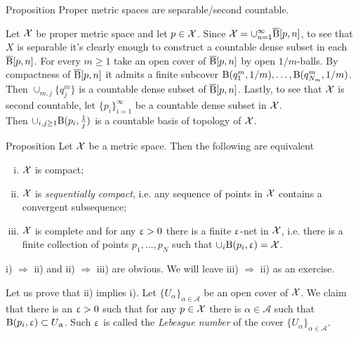 \begin{thm}{Proposition}
Proper metric spaces are separable/second countable.
\end{thm}
Let $\mathcal{X}$ be  proper metric space and let $p\in \spc{X}$. Since $\spc{X}=\cup_{n=1}^\infty\cBall[p,n]$, to see that $X$ is separable it's clearly enough to construct a countable dense subset in  each $\overline{\mathrm{B}}{}[p,n]$. For every $m\ge 1$  take  an open cover of $\overline{\mathrm{B}}{}[p,n]$ by open $1/m$-balls. By compactness of $\overline{\mathrm{B}}{}[p,n]$ it admits a finite subcover $\mathrm{B}{}(q^m_1,1/m),\ldots, \mathrm{B}{}(q^m_{N_m},1/m)$. Then $\cup_{m, j} \{q^m_j\}$ is a countable dense subset of $\overline{\mathrm{B}}{}[p,n]$.
Lastly, to see that $\mathcal{X}$ is second countable, let $\{p_i\}_{i=1}^\infty$ be a countable dense subset in $\mathcal{X}$. \\ Then $\cup_{i,j\ge 1} \oBall(p_i,\frac 1 j)$ is a countable basis of topology of $\mathcal{X}$.
\qeds


\begin{thm}{Proposition}\label{compact=seq-compact}
Let $\mathcal{X}$ be a metric space. Then the following are equivalent
\begin{enumerate}[i)]
\item $\mathcal{X}$ is compact;
\item $\mathcal{X}$ is \emph{sequentially compact}, i.e. any sequence of points in $\mathcal{X}$ contains a convergent subsequence;
\item $\mathcal{X}$ is complete and for any $\upvarepsilon>0$ there is a finite $\upvarepsilon$-net in $\mathcal{X}$, i.e. there is a finite collection of points $p_1,\ldots,p_{N}$ such that $\cup_i\oBall(p_i,\eps)=\spc{X}$.
\end{enumerate}
\end{thm}
i) $\Rightarrow$ ii)  and ii) $\Rightarrow$  iii) are  obvious. We will leave iii) $\Rightarrow$  ii) as an exercise.

Let us prove that ii) implies i). Let $\{U_\alpha\}_{\alpha\in\mathcal A}$ be an open cover of $\mathcal{X}$. 
We claim that there is an $\upvarepsilon>0$ such that for any $p\in \spc{X}$ there is $\alpha\in\mathcal A$ such that $\oBall(p_i,\eps)\subset U_\alpha$. Such $\upvarepsilon$ is called the \emph{ Lebesgue number}  of the cover  $\{U_\alpha\}_{\alpha\in\mathcal A}$.

